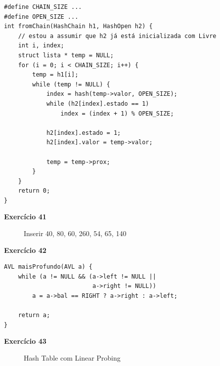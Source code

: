 \documentclass[a4paper,11pt]{article}
\begin{document}
\begin{verbatim}
#define CHAIN_SIZE ...
#define OPEN_SIZE ...
int fromChain(HashChain h1, HashOpen h2) {
	// estou a assumir que h2 já está inicializada com Livre
	int i, index;
	struct lista * temp = NULL;
	for (i = 0; i < CHAIN_SIZE; i++) {
		temp = h1[i];
		while (temp != NULL) {
			index = hash(temp->valor, OPEN_SIZE);
			while (h2[index].estado == 1)
				index = (index + 1) % OPEN_SIZE;
			
			h2[index].estado = 1;
			h2[index].valor = temp->valor;
			
			temp = temp->prox;
		}
	}
	return 0;
}
\end{verbatim}

\noindent \textbf{Exercício 41}

\begin{figure}[H]
	\centering
	\caption{Inserir 40, 80, 60, 260, 54, 65, 140}
\end{figure}

\noindent \textbf{Exercício 42}

\begin{verbatim}
AVL maisProfundo(AVL a) {
	while (a != NULL && (a->left != NULL || 
						 a->right != NULL))
		a = a->bal == RIGHT ? a->right : a->left;
	
	return a;
}
\end{verbatim}

\noindent \textbf{Exercício 43}

\begin{figure}[H]
	\centering
	\caption{Hash Table com Linear Probing}
\end{figure}
\end{document}
